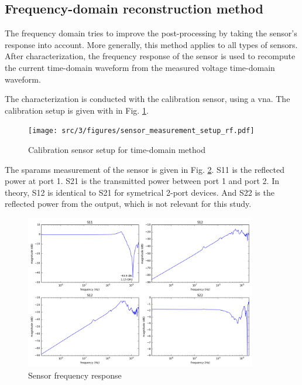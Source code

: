 \subsection{Frequency-domain reconstruction method}
The frequency domain tries to improve the post-processing by taking the sensor's response into account.
More generally, this method applies to all types of sensors.
After characterization, the frequency response of the sensor is used to recompute the current time-domain waveform from the measured voltage time-domain waveform.

The characterization is conducted with the calibration sensor, using a \gls{vna}.
The calibration setup is given with in Fig. \ref{fig:calibration-sensor-rf}.

\begin{figure}[!h]
  \centering
  \texttt{[image: src/3/figures/sensor\_measurement\_setup\_rf.pdf]}
  \caption{Calibration sensor setup for time-domain method}
  \label{fig:calibration-sensor-rf}
\end{figure}

The \gls{sparams} measurement of the sensor is given in Fig. \ref{fig:sensor-response}.
S11 is the reflected power at port 1.
S21 is the transmitted power between port 1 and port 2.
In theory, S12 is identical to S21 for symetrical 2-port devices.
And S22 is the reflected power from the output, which is not relevant for this study.

\begin{figure}[!h]
  \centering
  \includegraphics[width=0.9\textwidth]{src/3/figures/sensor_freq_response.png}
  \caption{Sensor frequency response}
  \label{fig:sensor-response}
\end{figure}

